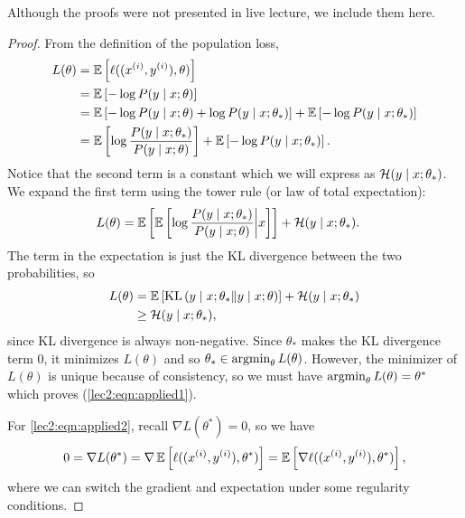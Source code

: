 Although the proofs were not presented in live lecture, we include them here.

\begin{proof}
From the definition of the population loss,
\begin{align}
    L(\theta) &= \operatorname*{\mathbb{E}} \left[ \ell((x^{(i)}, y^{(i)}), \theta) \right]\\
    &= \operatorname*{\mathbb{E}} \left[ - \log P(y \mid x; \theta) \right] \\
    &= \operatorname*{\mathbb{E}} \left[ - \log P(y \mid x; \theta) + \log P(y \mid x; \theta_*) \right] + \operatorname*{\mathbb{E}} \left[ - \log P(y \mid x; \theta_*) \right] \\
    &= \operatorname*{\mathbb{E}} \left[ \log \frac{P(y \mid x; \theta_*)}{P(y \mid x; \theta)} \right] + \operatorname*{\mathbb{E}} \left[ - \log P(y \mid x; \theta_*) \right].
\end{align}
Notice that the second term is a constant which we will express as $\mathcal H(y \mid x; \theta_*)$. We expand the first term using the tower rule (or law of total expectation):
\begin{align}
    L(\theta) &= \operatorname*{\mathbb{E}} \left[ \operatorname*{\mathbb{E}} \left[ \log \frac{P(y \mid x; \theta_*)}{P(y \mid x; \theta)} \biggr\vert x \right] \right] + \mathcal H(y \mid x; \theta_*).
\end{align}
The term in the expectation is just the KL divergence between the two probabilities, so 
\begin{align}
    L(\theta) &= \operatorname*{\mathbb{E}} \left[ \operatorname{KL} \left( y \mid x; \theta_* \| y \mid x; \theta \right) \right] + \mathcal H(y \mid x; \theta_*) \\
    &\geq \mathcal H(y \mid x; \theta_*),
\end{align}
since KL divergence is always non-negative. Since $\theta_*$ makes the KL divergence term 0, it minimizes $L(\theta)$ and so $\theta_* \in \operatorname*{\textup{argmin}}_\theta L(\theta)$. However, the minimizer of $L(\theta)$ is unique because of consistency, so  we must have $\operatorname*{\textup{argmin}}_\theta L(\theta) = \theta^*$ which proves (\ref{lec2:eqn:applied1}).

For \eqref{lec2:eqn:applied2}, recall $\nabla L(\theta^*) = 0$, so we have
\begin{equation}
0 = \nabla L(\theta^*) = \nabla \operatorname*{\mathbb{E}} \left[ \ell((x^{(i)}, y^{(i)}), \theta^*) \right] = \operatorname*{\mathbb{E}} \left[ \nabla \ell((x^{(i)}, y^{(i)}), \theta^*) \right],
\end{equation}
where we can switch the gradient and expectation under some regularity conditions.


\end{proof}
